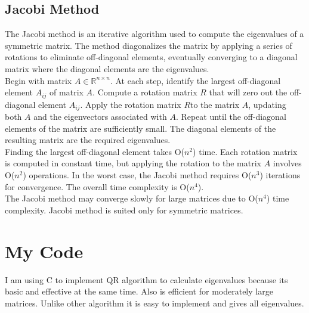 \documentclass{article}
\begin{document}
\subsection*{Jacobi Method}
The Jacobi method is an iterative algorithm used to compute the eigenvalues of a symmetric matrix. The method diagonalizes the matrix by applying a series of rotations to eliminate off-diagonal elements, eventually converging to a diagonal matrix where the diagonal elements are the eigenvalues.
\\Begin with matrix $A \in {\mathbb{R}^{n{\times}n}}$. At each step, identify the largest off-diagonal element $A_{ij}$ of matrix $A$. Compute a rotation matrix $R$ that will zero out the off-diagonal element $A_{ij}$. Apply the rotation matrix $R$to the matrix $A$, updating both $A$ and the eigenvectors associated with $A$. Repeat until the off-diagonal elements of the matrix are sufficiently small. The diagonal elements of the resulting matrix are the required eigenvalues.
\\Finding the largest off-diagonal element takes O($n^2$) time.  Each rotation matrix is computed in constant time, but applying the rotation to the matrix $A$ involves O($n^2$) operations.  In the worst case, the Jacobi method requires O($n^3$) iterations for convergence. The overall time complexity is O($n^4$).
\\ The Jacobi method may converge slowly for large matrices due to O($n^4$) time complexity. Jacobi method is suited only for symmetric matrices.
\section*{My Code}
I am using C to implement QR algorithm to calculate eigenvalues because its basic and effective at the same time. Also is efficient for moderately large matrices. Unlike other algorithm it is easy to implement and gives all eigenvalues.
\end{document}
